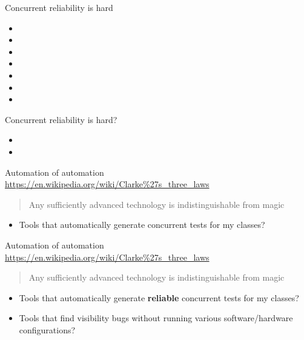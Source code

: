 \begin{frame}[t,fragile]{Concurrent reliability is hard}
\begin{itemize}
  \item \alarmOne
  \item \alarmTwo
  \item \alarmThree
  \item \alarmFour
  \item \alarmFive
  \item \alarmSix
  \item \alarmSeven
\end{itemize}
\end{frame}

\begin{frame}{Concurrent reliability is hard?}
\begin{itemize}
  \item \alarmOne
  \item \alarmThree  
\end{itemize}
\end{frame}

\begin{frame}[t,fragile]{Automation of automation}
\url{https://en.wikipedia.org/wiki/Clarke\%27s_three_laws}
\begin{quote}
  Any sufficiently advanced technology is indistinguishable from magic
\end{quote}

\pause

\begin{itemize}
  \item Tools that automatically generate concurrent tests for my classes?  
\end{itemize}
\end{frame}

\begin{frame}{Automation of automation}
\url{https://en.wikipedia.org/wiki/Clarke\%27s_three_laws}
\begin{quote}
  Any sufficiently advanced technology is indistinguishable from magic
\end{quote}

\begin{itemize}
  \item Tools that automatically generate \textbf{reliable} concurrent tests for my classes?
  \pause \item Tools that find visibility bugs without running various software/hardware configurations?
\end{itemize}
\end{frame}

